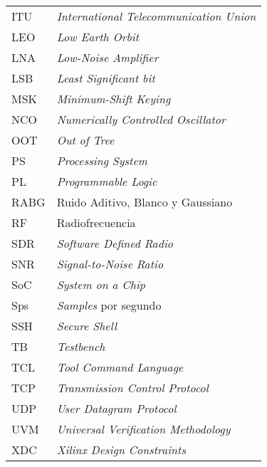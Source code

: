 \documentclass[screen, pagebackref,oneside]{ibtesis}
\begin{document}
\begin{preliminary}
\begin{abreviaturas}
\begin{longtable}{ll}
            ITU &   \textit{International Telecommunication Union} \\
            LEO &   \textit{Low Earth Orbit}        \\
            LNA &   \textit{Low-Noise Amplifier}    \\
            LSB &   \textit{Least Significant bit}  \\
            MSK &   \textit{Minimum-Shift Keying}  \\
            NCO &   \textit{Numerically Controlled Oscillator}  \\
            OOT &   \textit{Out of Tree}    \\
            PS  &   \textit{Processing System}  \\
            PL  &   \textit{Programmable Logic} \\
            RABG &  Ruido Aditivo, Blanco y Gaussiano   \\
            RF  &   Radiofrecuencia                 \\
            SDR &   \textit{Software Defined Radio} \\
            SNR &   \textit{Signal-to-Noise Ratio}  \\
            SoC &   \textit{System on a Chip}       \\
            Sps &   \textit{Samples} por segundo   \\
            SSH &   \textit{Secure Shell}   \\
            TB  &   \textit{Testbench}  \\
            TCL &   \textit{Tool Command Language}  \\
            TCP &   \textit{Transmission Control Protocol}  \\
            UDP &   \textit{User Datagram Protocol} \\
            UVM &   \textit{Universal Verification Methodology} \\
            XDC &   \textit{Xilinx Design Constraints}
        \end{longtable}
    \end{abreviaturas}
    
    \tableofcontents                %
    \listoffigures                  %
    \listoftables                   %
    
    
\end{preliminary}










\end{document}
